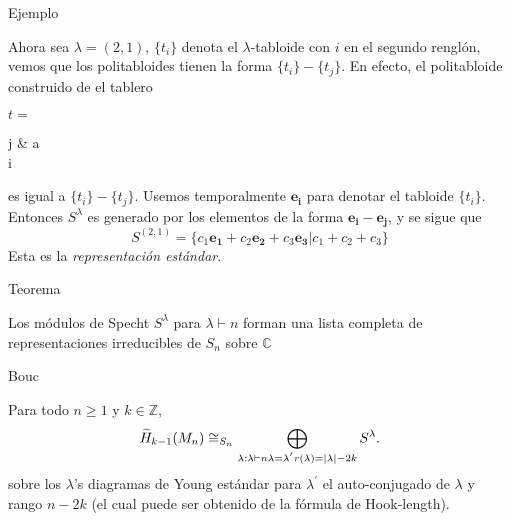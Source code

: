 \documentclass[final,xcolor=svgnames]{beamer}
\begin{document}
\begin{frame}{}
\begin{columns}
\begin{column}{0.5\textwidth}
\begin{block}{Ejemplo}
\begin{scriptsize}
         Ahora sea $\lambda=(2,1)$, $\{t_{i}\}$ denota el $\lambda$-tabloide
         con $i$ en el segundo renglón, vemos que los politabloides tienen la
         forma  $\{t_{i}\}- \{t_{j}\}$. En efecto, el politabloide construido
         de el tablero
         \begin{center}$t=$
           \begin{ytableau}
             j & a \\
             i\\
           \end{ytableau}
         \end{center}
         es igual a $\{t_{i}\}- \{t_{j}\}$. Usemos temporalmente
         $\boldsymbol{e_{i}}$ para denotar el tabloide $\{t_{i}\}$. Entonces
         $S^{\lambda}$ es generado por los elementos de la forma
         $\boldsymbol{e_{i}}-\boldsymbol{e_{j}}$, y se sigue que
         $$S^{(2,1)}=\{c_{1}\boldsymbol{e_{1}}+c_{2}\boldsymbol{e_{2}}+c_{3}\boldsymbol{e_{3}}|c_{1}+c_{2}+c_{3}\}$$ 
         Esta es la \textit{representación estándar}. 
       \end{scriptsize}
     \end{block}

     \begin{block}{Teorema}
       \begin{scriptsize}         
         Los módulos de Specht $S^{\lambda}$ para $\lambda\vdash n$ forman
         una lista completa de representaciones irreducibles de $S_{n}$ sobre $\mathbb{C}$
        \end{scriptsize}
      \end{block}

      \begin{block}{Bouc}
        \begin{scriptsize}
          Para todo $n\geq1$ y $k\in \mathbb{Z}$,
          \begin{equation*}
            \widetilde H_{k-1}(M_{n})\cong_{S_{n}}\bigoplus_{\lambda:\lambda\vdash n\\
              \lambda=\lambda^{'}\\r(\lambda)=\mid \lambda \mid-2k} S^{\lambda}.
          \end{equation*}
          sobre los $\lambda$'s diagramas de Young estándar para $\lambda^{'}$
          el auto-conjugado de $\lambda$ y rango $n-2k$ (el cual puede ser
          obtenido de la fórmula de Hook-length).
        \end{scriptsize}
      \end{block}
    \end{column}
  \end{columns}


\end{frame}
\end{document}
